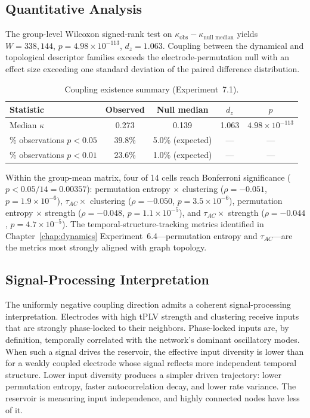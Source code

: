 \subsection{Quantitative Analysis}

The group-level Wilcoxon signed-rank test on $\kappa_{\text{obs}} - \kappa_{\text{null median}}$ yields $W = 338{,}144$, $p = 4.98 \times 10^{-113}$, $d_z = 1.063$. Coupling between the dynamical and topological descriptor families exceeds the electrode-permutation null with an effect size exceeding one standard deviation of the paired difference distribution.

\begin{table}[htbp]
\centering
\caption{Coupling existence summary (Experiment~7.1).}
\label{tab:coupling_existence}
\small
\begin{tabular}{lcccc}
\toprule
\textbf{Statistic} & \textbf{Observed} & \textbf{Null median} & \textbf{$d_z$} & \textbf{$p$} \\
\midrule
Median $\kappa$ & 0.273 & 0.139 & 1.063 & $4.98 \times 10^{-113}$ \\
\% observations $p < 0.05$ & 39.8\% & 5.0\% (expected) & --- & --- \\
\% observations $p < 0.01$ & 23.6\% & 1.0\% (expected) & --- & --- \\
\bottomrule
\end{tabular}
\end{table}

Within the group-mean matrix, four of 14 cells reach Bonferroni significance ($p < 0.05/14 = 0.00357$): permutation entropy $\times$ clustering ($\rho = -0.051$, $p = 1.9 \times 10^{-6}$), $\tau_{AC} \times$ clustering ($\rho = -0.050$, $p = 3.5 \times 10^{-6}$), permutation entropy $\times$ strength ($\rho = -0.048$, $p = 1.1 \times 10^{-5}$), and $\tau_{AC} \times$ strength ($\rho = -0.044$, $p = 4.7 \times 10^{-5}$). The temporal-structure-tracking metrics identified in Chapter~\ref{chap:dynamics} Experiment~6.4---permutation entropy and $\tau_{AC}$---are the metrics most strongly aligned with graph topology.

\subsection{Signal-Processing Interpretation}

The uniformly negative coupling direction admits a coherent signal-processing interpretation. Electrodes with high tPLV strength and clustering receive inputs that are strongly phase-locked to their neighbors. Phase-locked inputs are, by definition, temporally correlated with the network's dominant oscillatory modes. When such a signal drives the reservoir, the effective input diversity is lower than for a weakly coupled electrode whose signal reflects more independent temporal structure. Lower input diversity produces a simpler driven trajectory: lower permutation entropy, faster autocorrelation decay, and lower rate variance. The reservoir is measuring input independence, and highly connected nodes have less of it.


